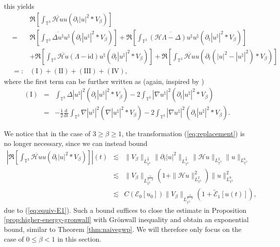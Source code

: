 this yields
\begin{eqnarray}
  &  & \Re \left[ \int_{\mathbb{T}^3} \overline{\mathcal{H} u} u (\partial_t
  | u |^2 \ast V_{\beta}) \right] \nonumber\\
  & = & \Re \left[ \int_{\mathbb{T}^3} \overline{\Delta u^{\natural}}
  u^{\natural} (\partial_t | u^{\natural} |^2 \ast V_{\beta}) \right] + \Re
  \left[ \int_{\mathbb{T}^3} \overline{(\mathcal{H} \Lambda - \Delta)
  u^{\natural}} u^{\natural} (\partial_t | u^{\natural} |^2 \ast V_{\beta})
  \right] \nonumber\\
  &  & + \Re \left[ \int_{\mathbb{T}^3} \overline{\mathcal{H} u} (\Lambda -
  \mathrm{id}) u^{\natural} (\partial_t | u^{\natural} |^2 \ast V_{\beta})
  \right] + \Re \left[ \int_{\mathbb{T}^3} \overline{\mathcal{H} u} u
  (\partial_t (| u |^2 - | u^{\natural} |^2) \ast V_{\beta}) \right]
  \nonumber\\
  & =: & (\mathrm{I}) + (\mathrm{I} \mathrm{I}) + (\mathrm{I} \mathrm{I} \mathrm{I}) +
  (\mathrm{IV}),  \label{eq:replacement}
\end{eqnarray}
where the first term can be further written as (again, inspired by
{\cite{PTV17}})
\begin{eqnarray}
  (\mathrm{I}) & = & \int_{\mathbb{T}^3} \Delta | u^{\natural} |^2 (\partial_t |
  u^{\natural} |^2 \ast V_{\beta}) - 2 \int_{\mathbb{T}^3} | \nabla
  u^{\natural} |^2 (\partial_t | u^{\natural} |^2 \ast V_{\beta}) \nonumber\\
  & = & - \frac{1}{2} \frac{\mathrm{d}}{\mathrm{dt}} \int_{\mathbb{T}^3} \nabla |
  u^{\natural} |^2 (\nabla | u^{\natural} |^2 \ast V_{\beta}) - 2
  \int_{\mathbb{T}^3} | \nabla u^{\natural} |^2 (\partial_t | u^{\natural} |^2
  \ast V_{\beta}) . \label{eq:def-I-term} 
\end{eqnarray}
\begin{rem*}
  We notice that in the case of $3 \geqslant \beta \geqslant 1$, the
  transformation (\ref{eq:replacement}) is no longer necessary, since we can
  instead bound
  \begin{eqnarray*}
    \left| \Re \left[ \int_{\mathbb{T}^3} \overline{\mathcal{H} u} u
    (\partial_t | u |^2 \ast V_{\beta}) \right] \right| (t) & \lesssim & \|
    V_{\beta} \|_{L_{\mathbb{T}^3}^{\frac{3}{2}}} \| \partial_t | u |^2
    \|_{L_{\mathbb{T}^3}^{\frac{3}{2}}} \| \mathcal{H} u
    \|_{L_{\mathbb{T}^3}^2} \| u \|_{L_{\mathbb{T}^3}^6}\\
    & \lesssim & \| V_{\beta} \|_{L_{\mathbb{T}^3}^{\frac{3}{3 - \beta}}}
    \left( 1 + \| \mathcal{H} u \|^2_{L_{\mathbb{T}^3}^2} \right) \| u
    \|^2_{L_{\mathbb{T}^3}^6}\\
    & \lesssim & C (\mathcal{E}_0 [u_0]) \| V_{\beta}
    \|_{L_{\mathbb{T}^3}^{\frac{3}{3 - \beta}}} (1 + \tilde{\mathcal{E}}_1 [u
    (t)]),
  \end{eqnarray*}
  due to (\ref{eq:equiv-E1}). Such a bound suffices to close the estimate in
  Proposition \ref{prop:higher-energy-gronwall} with Gr{\"o}nwall inequality
  and obtain an exponential bound, similar to Theorem \ref{thm:naivegwp}. We
  will therefore only focus on the case of $0 \leqslant \beta < 1$ in this section. 
\end{rem*}

